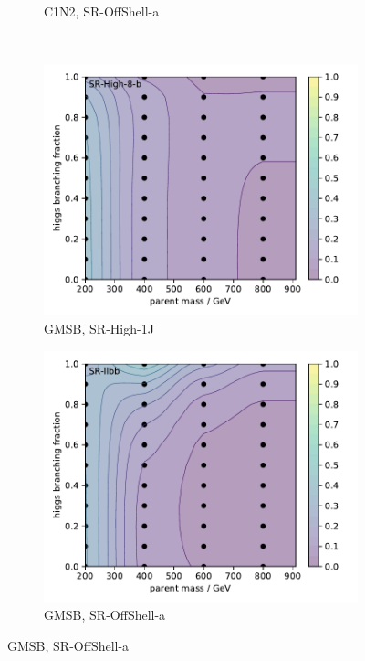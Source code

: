 \begin{figure}[tp]
\begin{subfigure}{0.495\textwidth}
\caption{C1N2, SR-OffShell-a}
\end{subfigure}
\\[0.5em]
\begin{subfigure}{0.495\textwidth}
\centering
\includegraphics[width=\textwidth]{figures/2ljets_signal_sys_gmsb_SRHigh8_2.pdf}
\caption{GMSB, SR-High-1J}
\end{subfigure}
\hfill
\begin{subfigure}{0.495\textwidth}
\centering
\includegraphics[width=\textwidth]{figures/2ljets_signal_sys_gmsb_SRllbb.pdf}
\caption{GMSB, SR-OffShell-a}
\end{subfigure}

\end{figure}
